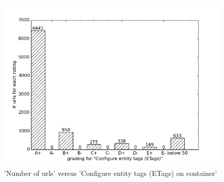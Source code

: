 \documentclass[conference]{IEEEtran}
\begin{document}
\begin{figure}[ht]
 \centering
  \includegraphics[scale=0.33]{new-img-jpg/container-jpg/Configure entity tags (ETags).jpg}
\caption{'Number of urls' versus 'Configure entity tags (ETags) on container'}	
\end{figure}
\end{document}
